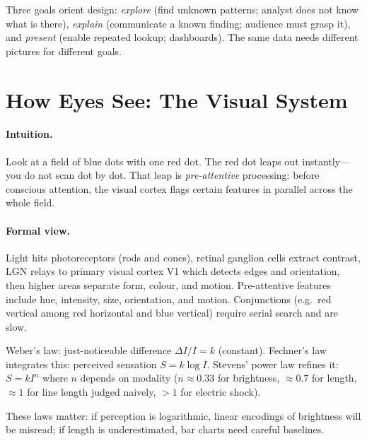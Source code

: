 Three goals orient design: \emph{explore} (find unknown patterns; analyst does not know what is there), \emph{explain} (communicate a known finding; audience must grasp it), and \emph{present} (enable repeated lookup; dashboards). The same data needs different pictures for different goals.

\section{How Eyes See: The Visual System}
\label{sec:visual-system}
\paragraph{Intuition.} Look at a field of blue dots with one red dot. The red dot leaps out instantly---you do not scan dot by dot. That leap is \emph{pre-attentive} processing: before conscious attention, the visual cortex flags certain features in parallel across the whole field.

\paragraph{Formal view.} Light hits photoreceptors (rods and cones), retinal ganglion cells extract contrast, LGN relays to primary visual cortex V1 which detects edges and orientation, then higher areas separate form, colour, and motion. Pre-attentive features include hue, intensity, size, orientation, and motion. Conjunctions (e.g.\ red vertical among red horizontal and blue vertical) require serial search and are slow.

\begin{definition}\label{def:perception-laws}
Weber's law: just-noticeable difference $\Delta I / I = k$ (constant). Fechner's law integrates this: perceived sensation $S = k \log I$. Stevens' power law refines it: $S = k I^{n}$ where $n$ depends on modality ($n\approx0.33$ for brightness, $\approx0.7$ for length, $\approx1$ for line length judged naively, $>1$ for electric shock).
\end{definition}

These laws matter: if perception is logarithmic, linear encodings of brightness will be misread; if length is underestimated, bar charts need careful baselines.

